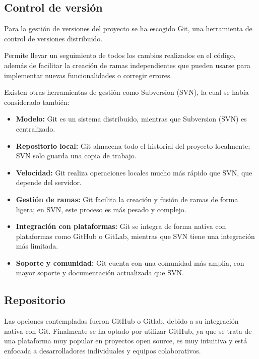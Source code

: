 \subsection{Control de versión}\label{subsec:control}

Para la gestión de versiones del proyecto se ha escogido Git\cite{git:official}, una herramienta de control de versiones distribuido.

Permite llevar un seguimiento de todos los cambios realizados en el código, además de facilitar la creación de ramas
independientes que pueden usarse para implementar nuevas funcionalidades o corregir errores.

Existen otras herramientas de gestión como Subversion (SVN)\cite{svn:official}, la cual se había considerado también:

\begin{itemize}
    \item \textbf{Modelo:} Git es un sistema distribuido, mientras que Subversion (SVN) es centralizado.
    \item \textbf{Repositorio local:} Git almacena todo el historial del proyecto localmente; SVN solo guarda una copia de trabajo.
    \item \textbf{Velocidad:} Git realiza operaciones locales mucho más rápido que SVN, que depende del servidor.
    \item \textbf{Gestión de ramas:} Git facilita la creación y fusión de ramas de forma ligera; en SVN, este proceso es más pesado y complejo.
    \item \textbf{Integración con plataformas:} Git se integra de forma nativa con plataformas como GitHub o GitLab, mientras que SVN tiene una integración más limitada.
    \item \textbf{Soporte y comunidad:} Git cuenta con una comunidad más amplia, con mayor soporte y documentación actualizada que SVN.
\end{itemize}

\subsection{Repositorio}\label{subsec:repositorio}

Las opciones contempladas fueron GitHub o Gitlab, debido a su integración nativa con Git.
Finalmente se ha optado por utilizar GitHub\cite{wikipedia:github}, ya que se trata de una plataforma muy popular en proyectos open source, es
muy intuitiva y está enfocada a desarrolladores individuales y equipos colaborativos.

